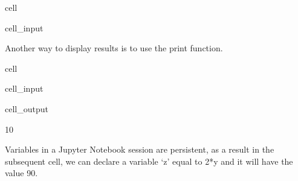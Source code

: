 \documentclass[letterpaper,10pt,english]{jupyterBook}
\begin{document}
\begin{sphinxuseclass}{cell}\begin{sphinxVerbatimInput}

\begin{sphinxuseclass}{cell_input}
\begin{sphinxVerbatim}[commandchars=\\\{\}]
  
  
\end{sphinxVerbatim}

\end{sphinxuseclass}\end{sphinxVerbatimInput}

\end{sphinxuseclass}
\sphinxAtStartPar
Another way to display results is to use the print function.

\begin{sphinxuseclass}{cell}\begin{sphinxVerbatimInput}

\begin{sphinxuseclass}{cell_input}
\begin{sphinxVerbatim}[commandchars=\\\{\}]
  
\end{sphinxVerbatim}

\end{sphinxuseclass}\end{sphinxVerbatimInput}
\begin{sphinxVerbatimOutput}

\begin{sphinxuseclass}{cell_output}
\begin{sphinxVerbatim}[commandchars=\\\{\}]
10
\end{sphinxVerbatim}

\end{sphinxuseclass}\end{sphinxVerbatimOutput}

\end{sphinxuseclass}
\sphinxAtStartPar
Variables in a Jupyter Notebook session are persistent, as a result in the subsequent cell, we can declare a variable ‘z’ equal to 2*y and it will have the value 90.
\end{document}

